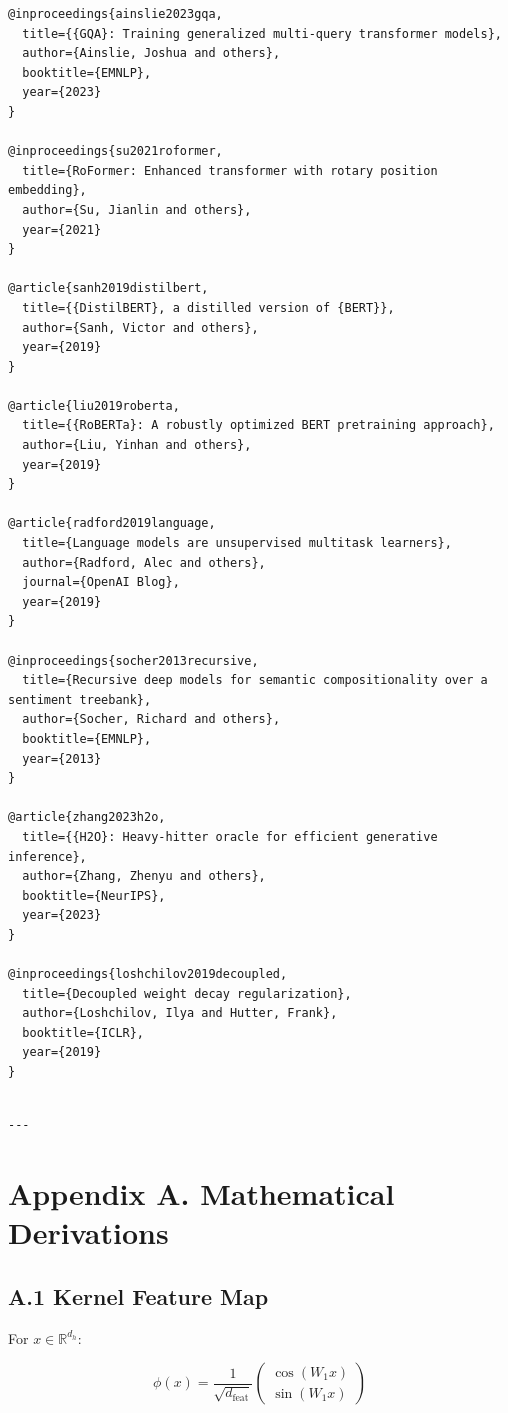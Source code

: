 \begin{lstlisting}
@inproceedings{ainslie2023gqa,
  title={{GQA}: Training generalized multi-query transformer models},
  author={Ainslie, Joshua and others},
  booktitle={EMNLP},
  year={2023}
}

@inproceedings{su2021roformer,
  title={RoFormer: Enhanced transformer with rotary position embedding},
  author={Su, Jianlin and others},
  year={2021}
}

@article{sanh2019distilbert,
  title={{DistilBERT}, a distilled version of {BERT}},
  author={Sanh, Victor and others},
  year={2019}
}

@article{liu2019roberta,
  title={{RoBERTa}: A robustly optimized BERT pretraining approach},
  author={Liu, Yinhan and others},
  year={2019}
}

@article{radford2019language,
  title={Language models are unsupervised multitask learners},
  author={Radford, Alec and others},
  journal={OpenAI Blog},
  year={2019}
}

@inproceedings{socher2013recursive,
  title={Recursive deep models for semantic compositionality over a sentiment treebank},
  author={Socher, Richard and others},
  booktitle={EMNLP},
  year={2013}
}

@article{zhang2023h2o,
  title={{H2O}: Heavy-hitter oracle for efficient generative inference},
  author={Zhang, Zhenyu and others},
  booktitle={NeurIPS},
  year={2023}
}

@inproceedings{loshchilov2019decoupled,
  title={Decoupled weight decay regularization},
  author={Loshchilov, Ilya and Hutter, Frank},
  booktitle={ICLR},
  year={2019}
}
\end{lstlisting}
\begin{lstlisting}

---
\end{lstlisting}

\section{Appendix A. Mathematical Derivations}

\subsection{A.1 Kernel Feature Map}

For $x \in \mathbb{R}^{d_h}$:

\[
\phi(x) = \frac{1}{\sqrt{d_\text{feat}}} \begin{pmatrix} \cos(W_1 x) \\ \sin(W_1 x) \end{pmatrix}
\tag{A.1}
\]

